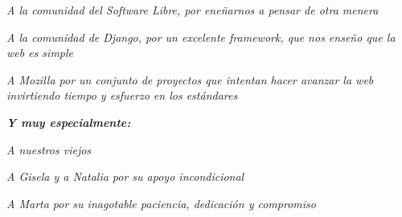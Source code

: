 \newpage
\thispagestyle{empty}
\begin{flushright}


{\it A la comunidad del Software Libre, por eneñarnos a pensar de otra
menera}\par

{\it A la comunidad de Django, por un excelente framework, que nos enseño que 
la web es simple }\par
{\it A Mozilla por un conjunto de proyectos que intentan hacer avanzar la web
invirtiendo tiempo y esfuerzo en los estándares }\par
\par
\par
\vfill
{\it{\bf Y muy especialmente:}}\par
{\it A nuestros viejos}\par
{\it A Gisela y a Natalia por su apoyo incondicional}\par
{\it A Marta por su inagotable paciencia, dedicación y compromiso}\par


\end{flushright}
\newpage